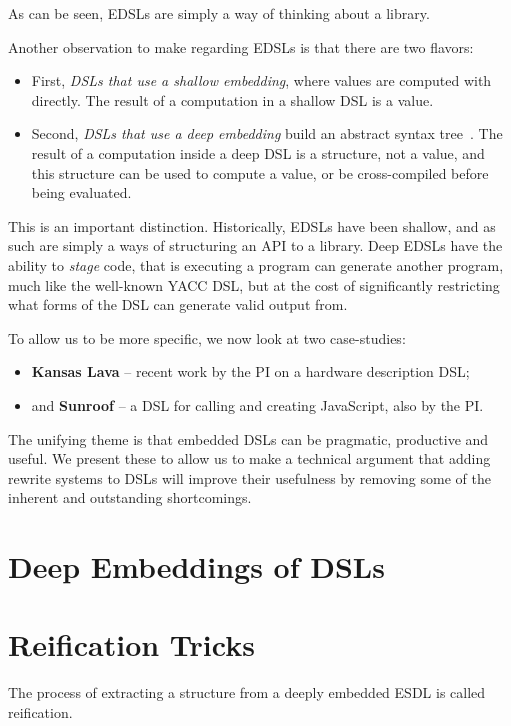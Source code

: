 \documentclass[11pt]{article}
\begin{document}
As can be seen, EDSLs are simply a way of thinking about a library.

Another observation to make regarding EDSLs is that
there are two flavors:
\begin{itemize}
\item First, {\em DSLs that use a shallow embedding\/}, where values are computed with directly.
The result of a computation in a shallow DSL is a value.
\item Second, {\em DSLs that use a deep embedding\/} build an abstract syntax tree~\cite{Elliott:03:CompileDSEL-JFP}.
The result of a computation inside a deep DSL
is a structure, not a value, and this structure can be used to compute a value,
or be cross-compiled before being evaluated.
\end{itemize}
This is an important distinction. Historically, EDSLs have been shallow,
and as such are simply a ways of structuring an API to a library. Deep EDSLs
have the ability to {\em stage\/} code, that is executing a program
can generate another program, much like the well-known YACC DSL,
but at the cost of significantly restricting what forms of the DSL can
generate valid output from.

To allow us to be more specific, we now
look at two case-studies:
\begin{itemize}
\item {\bf Kansas Lava} -- recent work by the PI on a hardware description DSL;
\item and {\bf Sunroof} -- a DSL for calling and creating JavaScript, also by the PI.
\end{itemize}
The unifying theme is that embedded DSLs can
be pragmatic, productive and useful. We present
these to allow us to make a technical argument that adding rewrite systems to
DSLs will improve their usefulness by removing
some of the inherent and outstanding shortcomings.

\section{Deep Embeddings of DSLs}

\section{Reification Tricks}

The process of extracting a structure from a deeply embedded ESDL
is called reification. 
\end{document}
